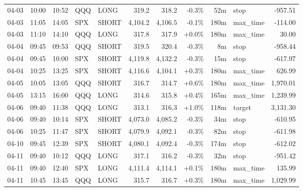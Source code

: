 \documentclass[11pt,a4paper,twoside]{article}
\begin{document}
\begin{center}
\begin{longtable}{>{\color{txtmain}}l l l l l r r r r >{\color{txtmain}}l r}
04-03 & 10:00 & 10:52 & QQQ & LONG & 319.2 & 318.2 & \textcolor{lossred}{-0.3\%} & 52m & stop & \textcolor{lossred}{-957.51} \\
04-03 & 11:05 & 14:05 & SPX & SHORT & 4,104.2 & 4,106.5 & \textcolor{lossred}{-0.1\%} & 180m & max\_time & \textcolor{lossred}{-114.00} \\
04-03 & 11:10 & 14:10 & QQQ & LONG & 317.8 & 317.9 & \textcolor{wingreen}{+0.0\%} & 180m & max\_time & \textcolor{wingreen}{30.00} \\
04-04 & 09:45 & 09:53 & QQQ & SHORT & 319.5 & 320.4 & \textcolor{lossred}{-0.3\%} & 8m & stop & \textcolor{lossred}{-958.44} \\
04-04 & 09:45 & 10:00 & SPX & SHORT & 4,119.8 & 4,132.2 & \textcolor{lossred}{-0.3\%} & 15m & stop & \textcolor{lossred}{-617.97} \\
04-04 & 10:25 & 13:25 & SPX & SHORT & 4,116.6 & 4,104.1 & \textcolor{wingreen}{+0.3\%} & 180m & max\_time & \textcolor{wingreen}{626.99} \\
04-05 & 10:05 & 13:05 & QQQ & SHORT & 316.7 & 314.7 & \textcolor{wingreen}{+0.6\%} & 180m & max\_time & \textcolor{wingreen}{1,970.01} \\
04-05 & 13:15 & 16:00 & QQQ & LONG & 314.6 & 315.8 & \textcolor{wingreen}{+0.4\%} & 165m & max\_time & \textcolor{wingreen}{1,239.99} \\
04-06 & 09:40 & 11:38 & QQQ & LONG & 313.1 & 316.3 & \textcolor{wingreen}{+1.0\%} & 118m & target & \textcolor{wingreen}{3,131.30} \\
04-06 & 09:40 & 10:14 & SPX & SHORT & 4,073.0 & 4,085.2 & \textcolor{lossred}{-0.3\%} & 34m & stop & \textcolor{lossred}{-610.95} \\
04-06 & 10:25 & 11:47 & SPX & SHORT & 4,079.9 & 4,092.1 & \textcolor{lossred}{-0.3\%} & 82m & stop & \textcolor{lossred}{-611.98} \\
04-10 & 09:45 & 12:39 & SPX & SHORT & 4,080.1 & 4,092.4 & \textcolor{lossred}{-0.3\%} & 174m & stop & \textcolor{lossred}{-612.02} \\
04-11 & 09:40 & 10:12 & QQQ & LONG & 317.1 & 316.2 & \textcolor{lossred}{-0.3\%} & 32m & stop & \textcolor{lossred}{-951.42} \\
04-11 & 09:40 & 12:40 & SPX & LONG & 4,111.4 & 4,114.1 & \textcolor{wingreen}{+0.1\%} & 180m & max\_time & \textcolor{wingreen}{135.99} \\
04-11 & 10:45 & 13:45 & QQQ & LONG & 315.7 & 316.7 & \textcolor{wingreen}{+0.3\%} & 180m & max\_time & \textcolor{wingreen}{1,029.99} \\

\end{longtable}
\end{center}
\end{document}
